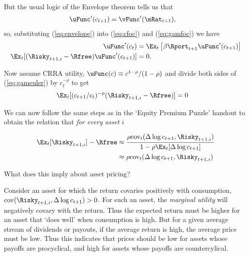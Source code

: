 \documentclass{handout}
\begin{document}
But the usual logic of the Envelope theorem tells us that 
\begin{equation}\begin{gathered}\begin{aligned}
        \uFunc^{\prime}(c_{t+1}) & =  \vFunc^{\prime}(\mRat_{t+1}), \label{eq:envelope}
\end{aligned}\end{gathered}\end{equation}
so, substituting (\ref{eq:envelope}) into (\ref{eq:cfoc}) and (\ref{eq:gamfoc}) we have
\begin{equation}\begin{gathered}\begin{aligned}
        \uFunc^{\prime}(c_{t}) & =  \Ex_{t}\left[\beta \Rport_{t+1} \uFunc^{\prime}({c}_{t+1})\right] %
\\      \Ex_{t}[(\Risky_{t+1,i}-\Rfree)\uFunc^{\prime}({c}_{t+1})] & =  0 \label{eq:gameuler}
.
\end{aligned}\end{gathered}\end{equation}

Now assume CRRA utility, $\uFunc(c) \equiv c^{1-\rho}/(1-\rho)$ and divide both 
sides of (\ref{eq:gameuler}) by $c_{t}^{-\rho}$ to get
\begin{equation}\begin{gathered}\begin{aligned}
        \Ex_{t}[(c_{t+1}/c_{t})^{-\rho}(\Risky_{t+1,i}-\Rfree)] & =  0 \label{eq:gameulernew}
\end{aligned}\end{gathered}\end{equation}


We can now follow the same steps as in the `Equity Premium Puzzle' handout to
obtain the relation that {\it for every asset $i$} 

\begin{equation}\begin{gathered}\begin{aligned}
        \Ex_{t}[\Risky_{t+1,i}]-\Rfree & \approx  \frac{\rho \text{cov}_{t}(\Delta \log {c}_{t+1},\Risky_{t+1,i})}{1-\rho \Ex_{t}[ \Delta \log {c}_{t+1}]} 
\\                             & \approx  \rho \text{cov}_{t}(\Delta \log {c}_{t+1},\Risky_{t+1,i}) \label{eq:eqprem}
\end{aligned}\end{gathered}\end{equation}


What does this imply about asset pricing?  

Consider an asset for which the return covaries positively with 
consumption, $\mbox{cov}(\Risky_{t+1,i},\Delta \log c_{t+1}) > 0$.  For 
such an asset, the {\it marginal utility} will negatively covary with 
the return.  Thus the expected return must be higher for an asset 
that `does well' when consumption is high.  But for a given average 
stream of dividends or payouts, if the average return is high, the 
average price must be low.  Thus this indicates that prices should be 
low for assets whose payoffs are procyclical, and high for assets 
whose payoffs are countercylical.
\end{document}
